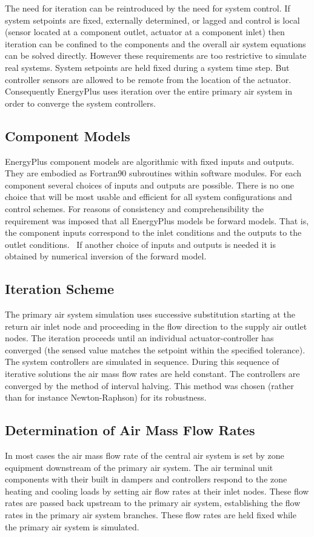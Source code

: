 The need for iteration can be reintroduced by the need for system control. If system setpoints are fixed, externally determined, or lagged and control is local (sensor located at a component outlet, actuator at a component inlet) then iteration can be confined to the components and the overall air system equations can be solved directly. However these requirements are too restrictive to simulate real systems. System setpoints are held fixed during a system time step. But controller sensors are allowed to be remote from the location of the actuator. Consequently EnergyPlus uses iteration over the entire primary air system in order to converge the system controllers.

\subsection{Component Models}\label{component-models}

EnergyPlus component models are algorithmic with fixed inputs and outputs. They are embodied as Fortran90 subroutines within software modules. For each component several choices of inputs and outputs are possible. There is no one choice that will be most usable and efficient for all system configurations and control schemes. For reasons of consistency and comprehensibility the requirement was imposed that all EnergyPlus models be forward models. That is, the component inputs correspond to the inlet conditions and the outputs to the outlet conditions.~ If another choice of inputs and outputs is needed it is obtained by numerical inversion of the forward model.

\subsection{Iteration Scheme}\label{iteration-scheme}

The primary air system simulation uses successive substitution starting at the return air inlet node and proceeding in the flow direction to the supply air outlet nodes. The iteration proceeds until an individual actuator-controller has converged (the sensed value matches the setpoint within the specified tolerance). The system controllers are simulated in sequence. During this sequence of iterative solutions the air mass flow rates are held constant. The controllers are converged by the method of interval halving. This method was chosen (rather than for instance Newton-Raphson) for its robustness.

\subsection{Determination of Air Mass Flow Rates}\label{determination-of-air-mass-flow-rates}

In most cases the air mass flow rate of the central air system is set by zone equipment downstream of the primary air system. The air terminal unit components with their built in dampers and controllers respond to the zone heating and cooling loads by setting air flow rates at their inlet nodes. These flow rates are passed back upstream to the primary air system, establishing the flow rates in the primary air system branches. These flow rates are held fixed while the primary air system is simulated.
